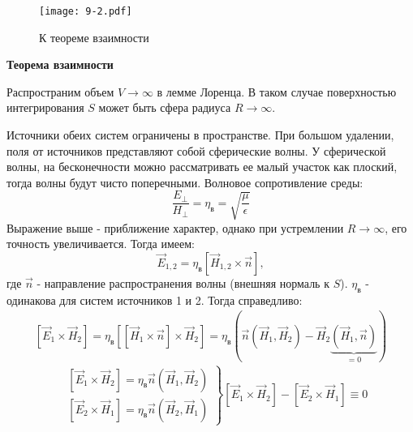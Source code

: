 \begin{figure}[h!]
	\centering
	\texttt{[image: 9-2.pdf]}
	\caption{К теореме взаимности}
\end{figure}
\textbf{Теорема взаимности}

Распространим объем $V\to\infty$ в лемме Лоренца. В таком случае поверхностью интегрирования $S$ может быть сфера
радиуса $R\to\infty$.

Источники обеих систем ограничены в пространстве. При большом удалении, поля от источников представляют собой
сферические волны. У сферической волны, на бесконечности можно рассматривать ее малый участок как плоский, тогда волны
будут чисто поперечными. Волновое сопротивление среды:
\begin{equation}
	\frac{E_{\perp}}{H_{\perp}} = \eta_{\text{в}} = \sqrt{\frac{\mu}{\epsilon}}	
\end{equation} 
Выражение выше - приближение характер, однако при устремлении $R\to\infty$, его точность увеличивается. Тогда имеем:
\begin{equation}
	\vec{E}_{1,2} = \eta_{\text{в}} \left[\vec{H}_{1,2} \times \vec{n}\right]	,
\end{equation}
где $\vec{n}$ - направление распространения волны (внешняя нормаль к $S$). $\eta_{\text{в}}$ - одинакова для систем
источников 1 и 2. Тогда справедливо:
\begin{align*}
	\left[\vec{E}_{1} \times \vec{H}_2 \right] = \eta_{\text{в}} \left[ \left[\vec{H}_{1} \times \vec{n}\right]\times \vec{H}_2\right] = \eta_{\text{в}} \left(\vec{n}(\vec{H}_1,\vec{H}_2) - \vec{H}_2\underbrace{(\vec{H}_1,\vec{n})}_{=0}\right) 
\end{align*}
\begin{equation}
	\left.
	\begin{aligned}
		&\left[\vec{E}_{1} \times \vec{H}_2 \right] = \eta_{\text{в}} \vec{n} (\vec{H}_1,\vec{H}_2)\\
		&\left[\vec{E}_{2} \times \vec{H}_1 \right] = \eta_{\text{в}} \vec{n} (\vec{H}_2,\vec{H}_1)
	\end{aligned}
	\right\} \left[\vec{E}_{1} \times \vec{H}_2 \right] - \left[\vec{E}_{2} \times \vec{H}_1 \right] \equiv 0
\end{equation}


